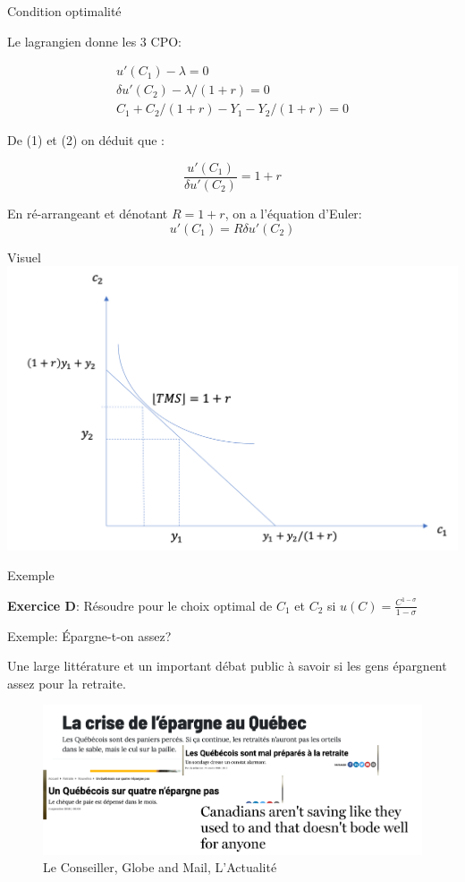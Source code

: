 \documentclass[handout]{beamer}
\begin{document}
\begin{frame}{Condition optimalité}

Le lagrangien donne les 3 CPO:

\begin{eqnarray}
 u'(C_1) - \lambda = 0  \\
\delta u'(C_2) - \lambda /(1+r) = 0  \\
C_1+C_2/(1+r) - Y_1 - Y_2/(1+r) = 0  
\end{eqnarray}

De (1) et (2) on déduit que : 

$$ \frac{u'(C_1)}{\delta u'(C_2)} = 1+r $$

En ré-arrangeant et dénotant $R=1+r$, on a l'équation d'Euler: 
$$ u'(C_1) = R\delta u'(C_2) $$
\end{frame}

\begin{frame}{Visuel}
\includegraphics[scale=0.5]{optimal.png}
\end{frame}

\begin{frame}{Exemple}

\textbf{Exercice D}: Résoudre pour le choix optimal de $C_1$ et $C_2$ si $u(C)=\frac{C^{1-\sigma}}{1-\sigma}$

\end{frame}

\begin{frame}{Exemple: Épargne-t-on assez?}

Une large littérature et un important débat public à savoir si les gens épargnent assez pour la retraite.

\begin{figure}
	\includegraphics[scale=0.4]{retraite.png} 
	\caption{Le Conseiller, Globe and Mail, L'Actualité}
\end{figure}

\end{frame}
\end{document}
